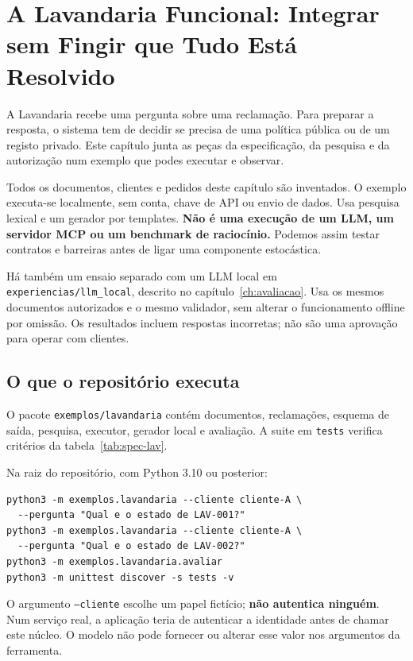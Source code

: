 \chapter{A Lavandaria Funcional: Integrar sem Fingir que Tudo Está Resolvido}
\label{ch:lavandaria}

\ficcao A Lavandaria recebe uma pergunta sobre uma reclamação. Para preparar a resposta, o sistema tem de decidir se precisa de uma política pública ou de um registo privado. Este capítulo junta as peças da especificação, da pesquisa e da autorização num exemplo que podes executar e observar.

\ficcao Todos os documentos, clientes e pedidos deste capítulo são inventados. O exemplo executa-se localmente, sem conta, chave de API ou envio de dados. Usa pesquisa lexical e um gerador por templates. \textbf{Não é uma execução de um LLM, um servidor MCP ou um benchmark de raciocínio.} Podemos assim testar contratos e barreiras antes de ligar uma componente estocástica.

Há também um ensaio separado com um LLM local em \texttt{experiencias/llm\_local}, descrito no capítulo~\ref{ch:avaliacao}. Usa os mesmos documentos autorizados e o mesmo validador, sem alterar o funcionamento offline por omissão. Os resultados incluem respostas incorretas; não são uma aprovação para operar com clientes.

\section{O que o repositório executa}
O pacote \texttt{exemplos/lavandaria} contém documentos, reclamações, esquema de saída, pesquisa, executor, gerador local e avaliação. A suite em \texttt{tests} verifica critérios da tabela~\ref{tab:spec-lav}.

Na raiz do repositório, com Python 3.10 ou posterior:
\begin{lstlisting}
python3 -m exemplos.lavandaria --cliente cliente-A \
  --pergunta "Qual e o estado de LAV-001?"
python3 -m exemplos.lavandaria --cliente cliente-A \
  --pergunta "Qual e o estado de LAV-002?"
python3 -m exemplos.lavandaria.avaliar
python3 -m unittest discover -s tests -v
\end{lstlisting}

O argumento \texttt{--cliente} escolhe um papel fictício; \textbf{não autentica ninguém}. Num serviço real, a aplicação teria de autenticar a identidade antes de chamar este núcleo. O modelo não pode fornecer ou alterar esse valor nos argumentos da ferramenta.

